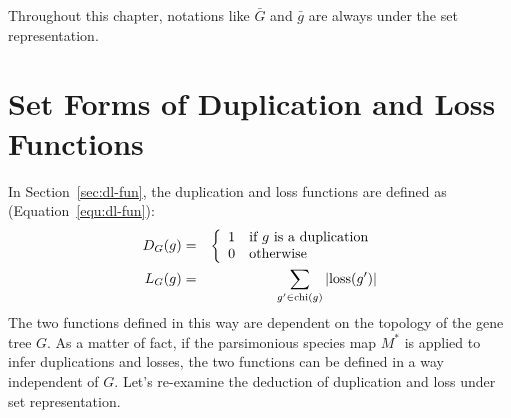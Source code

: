 Throughout this chapter, notations like $\bar{G}$ and $\bar{g}$ are always under the set representation.

\section{Set Forms of Duplication and Loss Functions}\label{sec:re-dl-fun}

In Section~\ref{sec:dl-fun}, the duplication and loss functions are defined as (Equation~\ref{equ:dl-fun}):
\begin{eqnarray}\label{equ:dl-fun-set}
D_G(g) &=& \left\{\begin{array}{ll}
    1 & \mbox{if $g$ is a duplication} \\
    0 & \mbox{otherwise}\end{array}\right. \\
L_G(g) &=& \sum_{g'\in\mathrm{chi}(g)}{|\mathrm{loss}(g')|}
\end{eqnarray}
The two functions defined in this way are dependent on the topology of the gene tree $G$.
As a matter of fact, if the parsimonious species map $M^*$ is applied to infer duplications and losses, the two functions
can be defined in a way independent of $G$. Let's re-examine the deduction of duplication and loss
under set representation.

